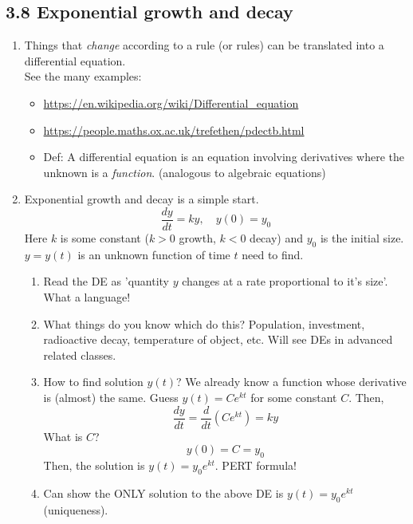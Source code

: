 \documentclass{article}
\begin{document}
\subsection{3.8 Exponential growth and decay}
\begin{enumerate}


\item Things that \emph{change} according to a rule (or rules) can be translated into a differential equation.  \\
 See the many examples:
\begin{itemize}
\item \url{https://en.wikipedia.org/wiki/Differential_equation}
\item \url{https://people.maths.ox.ac.uk/trefethen/pdectb.html}
\item Def: A differential equation is an equation involving derivatives where the unknown is a \emph{function}. (analogous to algebraic equations)
\end{itemize}


\item Exponential growth and decay is a simple start.
$$
\frac{dy}{dt} = ky, \quad y(0)=y_0
$$
Here $k$ is some constant ($k>0$ growth, $k<0$ decay) and $y_0$ is the initial size. $y=y(t)$ is an unknown function of time $t$ need to find.
\begin{enumerate}
\item Read the DE as 'quantity $y$ changes at a rate proportional to it's size'. What a language!
\item What things do you know which do this? Population, investment, radioactive decay, temperature of object, etc. Will see DEs in advanced related classes.
\item How to find solution $y(t)$? We already know a function whose derivative is (almost) the same. Guess $y(t)=Ce^{kt}$ for some constant $C$. Then,
$$
\frac{dy}{dt} = \frac{d}{dt}(Ce^{kt}) = ky 
$$
What is $C$?
$$
y(0) = C = y_0
$$
Then, the solution is $y(t)=y_0e^{kt}$. PERT formula!
\item Can show the ONLY solution to the above DE is $y(t)=y_0e^{kt}$ (uniqueness).
\end{enumerate}


\end{enumerate}
\end{document}
